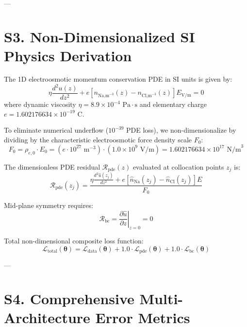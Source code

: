 \documentclass[3p,preprint,12pt,numbers,square,sort&compress]{elsarticle}
\begin{document}
---

\section{S3. Non-Dimensionalized SI Physics Derivation}

The 1D electroosmotic momentum conservation PDE in SI units is given by:
\begin{equation}
    \eta \frac{d^2 u(z)}{d z^2} + e \left[ n_{\text{Na,m}^{-3}}(z) - n_{\text{Cl,m}^{-3}}(z) \right] E_{\text{V/m}} = 0
    \tag{S10}
\end{equation}
where dynamic viscosity $\eta = 8.9 \times 10^{-4}\text{ Pa}\cdot\text{s}$ and elementary charge $e = 1.602176634 \times 10^{-19}\text{ C}$.

To eliminate numerical underflow ($10^{-39}$ PDE loss), we non-dimensionalize by dividing by the characteristic electroosmotic force density scale $F_0$:
\begin{equation}
    F_0 = \rho_{e,0} \cdot E_0 = \left(e \cdot 10^{27}\text{ m}^{-3}\right) \cdot \left(1.0 \times 10^9\text{ V/m}\right) = 1.602176634 \times 10^{17}\text{ N/m}^3
    \tag{S11}
\end{equation}

The dimensionless PDE residual $\mathcal{R}_{\text{pde}}(z)$ evaluated at collocation points $z_j$ is:
\begin{equation}
    \mathcal{R}_{\text{pde}}(z_j) = \frac{\eta \frac{d^2 \hat{u}(z_j)}{d z^2} + e \left[ \hat{n}_{\text{Na}}(z_j) - \hat{n}_{\text{Cl}}(z_j) \right] E}{F_0}
    \tag{S12}
\end{equation}

Mid-plane symmetry requires:
\begin{equation}
    \mathcal{R}_{\text{bc}} = \left. \frac{\partial \hat{u}}{\partial z} \right|_{z=0} = 0
    \tag{S13}
\end{equation}

Total non-dimensional composite loss function:
\begin{equation}
    \mathcal{L}_{\text{total}}(\boldsymbol{\theta}) = \mathcal{L}_{\text{data}}(\boldsymbol{\theta}) + 1.0 \cdot \mathcal{L}_{\text{pde}}(\boldsymbol{\theta}) + 1.0 \cdot \mathcal{L}_{\text{bc}}(\boldsymbol{\theta})
    \tag{S14}
\end{equation}

---

\section{S4. Comprehensive Multi-Architecture Error Metrics}
\end{document}
